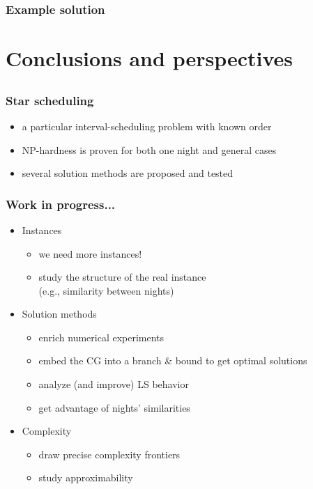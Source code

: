 \documentclass{beamer}
\begin{document}
\begin{frame}
  \frametitle{Example solution}
\end{frame}


\section[Conclusions]{Conclusions and perspectives}
\subsection{}

\begin{frame}
  \frametitle{Star scheduling}
  \begin{itemize}
  \item a particular interval-scheduling problem with known order
  \item NP-hardness is proven for both one night and general cases
  \item several solution methods are proposed and tested
  \end{itemize}
\end{frame}

\begin{frame}
  \frametitle{Work in progress...}
  \begin{itemize}

  \item Instances
    \begin{itemize}
    \item we need more instances!
    \item study the structure of the real instance \\ (e.g.,
      similarity between nights)
    \end{itemize}

    \vfill

  \item Solution methods
    \begin{itemize}
    \item enrich numerical experiments
    \item embed the CG into a branch \& bound to get optimal solutions
    \item analyze (and improve) LS behavior
    \item get advantage of nights' similarities
    \end{itemize}

    \vfill

  \item Complexity
    \begin{itemize}
    \item draw precise complexity frontiers
    \item study approximability
    \end{itemize}
  \end{itemize}

\end{frame}
\end{document}
